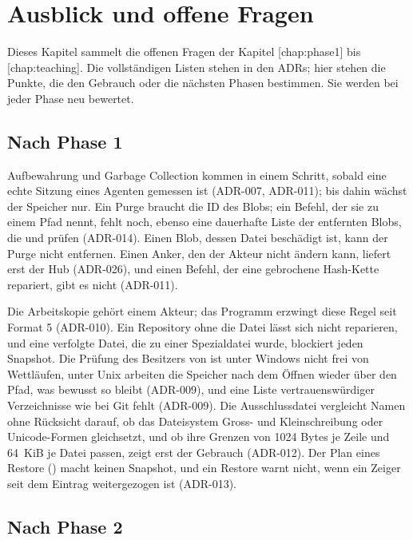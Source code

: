 \chapter[chap:outlook]{Ausblick und offene Fragen}

Dieses Kapitel sammelt die offenen Fragen der Kapitel \in{}[chap:phase1] bis \in{}[chap:teaching].
Die vollständigen Listen stehen in den ADRs; hier stehen die Punkte,
die den Gebrauch oder die nächsten Phasen bestimmen.
Sie werden bei jeder Phase neu bewertet.

\section{Nach Phase 1}

Aufbewahrung und Garbage Collection kommen in einem Schritt,
sobald eine echte Sitzung eines Agenten gemessen ist (ADR-007, ADR-011);
bis dahin wächst der Speicher nur.
Ein Purge braucht die ID des Blobs; ein Befehl, der sie zu einem Pfad nennt,
fehlt noch, ebenso eine dauerhafte Liste der entfernten Blobs, die  und
 prüfen (ADR-014).
Einen Blob, dessen Datei beschädigt ist, kann der Purge nicht entfernen.
Einen Anker, den der Akteur nicht ändern kann, liefert erst der Hub (ADR-026),
und einen Befehl, der eine gebrochene Hash-Kette repariert, gibt es nicht (ADR-011).

Die Arbeitskopie gehört einem Akteur; das Programm erzwingt diese Regel seit Format 5 (ADR-010).
Ein Repository ohne die Datei  lässt sich nicht reparieren,
und eine verfolgte Datei, die zu einer Spezialdatei wurde, blockiert jeden Snapshot.
Die Prüfung des Besitzers von  ist unter Windows nicht frei von Wettläufen,
unter Unix arbeiten die Speicher nach dem Öffnen wieder über den Pfad,
was bewusst so bleibt (ADR-009),
und eine Liste vertrauenswürdiger Verzeichnisse wie bei Git fehlt (ADR-009).
Die Ausschlussdatei vergleicht Namen ohne Rücksicht darauf,
ob das Dateisystem Gross- und Kleinschreibung oder Unicode-Formen gleichsetzt,
und ob ihre Grenzen von 1024 Bytes je Zeile und 64~KiB je Datei passen,
zeigt erst der Gebrauch (ADR-012).
Der Plan eines Restore () macht keinen Snapshot, und ein Restore warnt nicht,
wenn ein Zeiger seit dem Eintrag weitergezogen ist (ADR-013).

\section{Nach Phase 2}

